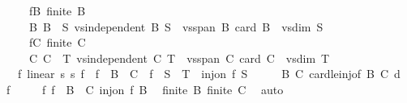 \begin{isabellebody}
\ \ \ \ \ fB{\isacharcolon}{\kern0pt}\ {\isachardoublequoteopen}finite\ B{\isachardoublequoteclose}\isanewline
\ \ \ \ \ B{\isacharcolon}{\kern0pt}\ {\isachardoublequoteopen}B\ {\isasymsubseteq}\ S{\isachardoublequoteclose}\ {\isachardoublequoteopen}vs{}{\isachardot}{\kern0pt}independent\ B{\isachardoublequoteclose}\ {\isachardoublequoteopen}S\ {\isasymsubseteq}\ vs{}{\isachardot}{\kern0pt}span\ B{\isachardoublequoteclose}\ {\isachardoublequoteopen}card\ B\ {\isacharequal}{\kern0pt}\ vs{}{\isachardot}{\kern0pt}dim\ S{\isachardoublequoteclose}\isanewline
\ \ \ \ \ fC{\isacharcolon}{\kern0pt}\ {\isachardoublequoteopen}finite\ C{\isachardoublequoteclose}\isanewline
\ \ \ \ \ C{\isacharcolon}{\kern0pt}\ {\isachardoublequoteopen}C\ {\isasymsubseteq}\ T{\isachardoublequoteclose}\ {\isachardoublequoteopen}vs{}{\isachardot}{\kern0pt}independent\ C{\isachardoublequoteclose}\ {\isachardoublequoteopen}T\ {\isasymsubseteq}\ vs{}{\isachardot}{\kern0pt}span\ C{\isachardoublequoteclose}\ {\isachardoublequoteopen}card\ C\ {\isacharequal}{\kern0pt}\ vs{}{\isachardot}{\kern0pt}dim\ T{\isachardoublequoteclose}\isanewline
\ \ \ {\isachardoublequoteopen}{\isasymexists}f{\isachardot}{\kern0pt}\ linear\ s{}\ s{}\ f\ {\isasymand}\ f\ {\isacharbackquote}{\kern0pt}\ B\ {\isacharequal}{\kern0pt}\ C\ {\isasymand}\ f\ {\isacharbackquote}{\kern0pt}\ S\ {\isacharequal}{\kern0pt}\ T\ {\isasymand}\ inj{\isacharunderscore}{\kern0pt}on\ f\ S{\isachardoublequoteclose}\isanewline
%
\isadelimproof
%
\endisadelimproof
%
\isatagproof
{}\isamarkupfalse%
\ {\isacharminus}{\kern0pt}\isanewline
\ \ \isamarkupfalse%
\ B{\isacharparenleft}{\kern0pt}{}{\isacharparenright}{\kern0pt}\ C{\isacharparenleft}{\kern0pt}{}{\isacharparenright}{\kern0pt}\ card{\isacharunderscore}{\kern0pt}le{\isacharunderscore}{\kern0pt}inj{\isacharbrackleft}{\kern0pt}of\ B\ C{\isacharbrackright}{\kern0pt}\ d\ \isamarkupfalse%
\ f\ \isanewline
\ \ \ \ f{\isacharcolon}{\kern0pt}\ {\isachardoublequoteopen}f\ {\isacharbackquote}{\kern0pt}\ B\ {\isasymsubseteq}\ C{\isachardoublequoteclose}\ {\isachardoublequoteopen}inj{\isacharunderscore}{\kern0pt}on\ f\ B{\isachardoublequoteclose}\ \isamarkupfalse%
\ {\isacartoucheopen}finite\ B{\isacartoucheclose}\ {\isacartoucheopen}finite\ C{\isacartoucheclose}\ \isamarkupfalse%
\ auto\isanewline

\end{isabellebody}
